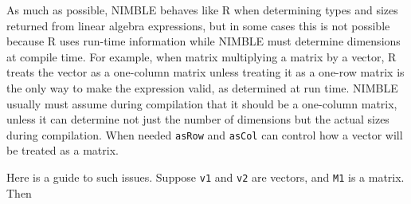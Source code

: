 \documentclass[12pt,oneside]{book}\usepackage[]{graphicx}\usepackage[]{color}
\def\cd#1{\texttt{#1}}
\begin{document}
As much as possible, NIMBLE behaves like R when determining types and
sizes returned from linear algebra expressions, but in some cases this
is not possible because R uses run-time information while NIMBLE must
determine dimensions at compile time. For example, when matrix
multiplying a matrix by a vector, R treats the vector as a one-column
matrix unless treating it as a one-row matrix is the only way to make
the expression valid, as determined at run time.  NIMBLE usually must assume during compilation
that it should be a one-column matrix, unless it can determine not
just the number of dimensions but the actual sizes during
compilation.  When needed \cd{asRow} and \cd{asCol} can control how a
vector will be treated as a matrix.

Here is a guide to such issues.  Suppose \cd{v1} and \cd{v2} are vectors, and \cd{M1} is a matrix.  Then
\end{document}
